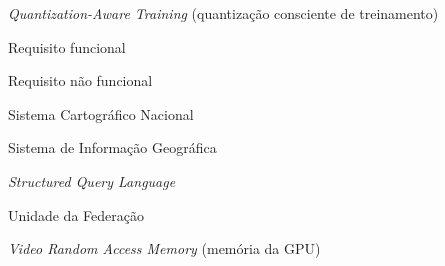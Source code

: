 \begin{siglas}
  \item[QAT]     \textit{Quantization-Aware Training} (quantização consciente de treinamento)
  \item[RF]      Requisito funcional
  \item[RNF]     Requisito não funcional
  \item[SCN]     Sistema Cartográfico Nacional
  \item[SIG]     Sistema de Informação Geográfica
  \item[SQL]     \textit{Structured Query Language}
  \item[UF]      Unidade da Federação
  \item[VRAM]    \textit{Video Random Access Memory} (memória da GPU)
\end{siglas}
